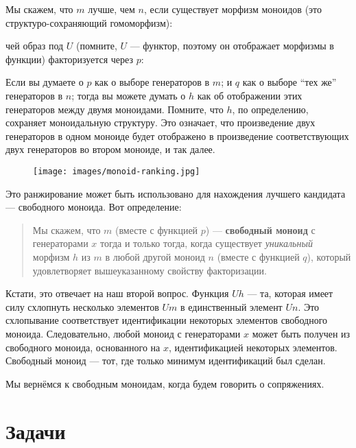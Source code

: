 Мы скажем, что $m$ лучше, чем $n$, если существует
морфизм моноидов (это структуро-сохраняющий гомоморфизм):

чей образ под $U$ (помните, $U$ --- функтор, поэтому он
отображает морфизмы в функции) факторизуется через $p$:

Если вы думаете о $p$ как о выборе генераторов в $m$;
и $q$ как о выборе ``тех же'' генераторов в $n$; тогда
вы можете думать о $h$ как об отображении этих генераторов между двумя
моноидами. Помните, что $h$, по определению, сохраняет моноидальную
структуру. Это означает, что произведение двух генераторов в одном моноиде будет
отображено в произведение соответствующих двух генераторов во втором
моноиде, и так далее.

\begin{figure}[H]
  \centering
  \texttt{[image: images/monoid-ranking.jpg]}
\end{figure}

\noindent
Это ранжирование может быть использовано для нахождения лучшего кандидата --- свободного моноида.
Вот определение:

\begin{quote}
  Мы скажем, что $m$ (вместе с функцией $p$) ---
  \textbf{свободный моноид} с генераторами $x$ тогда и только тогда, когда существует
  \emph{уникальный} морфизм $h$ из $m$ в любой другой
  моноид $n$ (вместе с функцией $q$), который удовлетворяет
  вышеуказанному свойству факторизации.
\end{quote}
Кстати, это отвечает на наш второй вопрос. Функция
$U h$ --- та, которая имеет силу схлопнуть несколько
элементов $U m$ в единственный элемент $U n$. Это
схлопывание соответствует идентификации некоторых элементов свободного моноида.
Следовательно, любой моноид с генераторами $x$ может быть получен из
свободного моноида, основанного на $x$, идентификацией некоторых элементов.
Свободный моноид --- тот, где только минимум идентификаций
был сделан.

Мы вернёмся к свободным моноидам, когда будем говорить о сопряжениях.

\section{Задачи}

